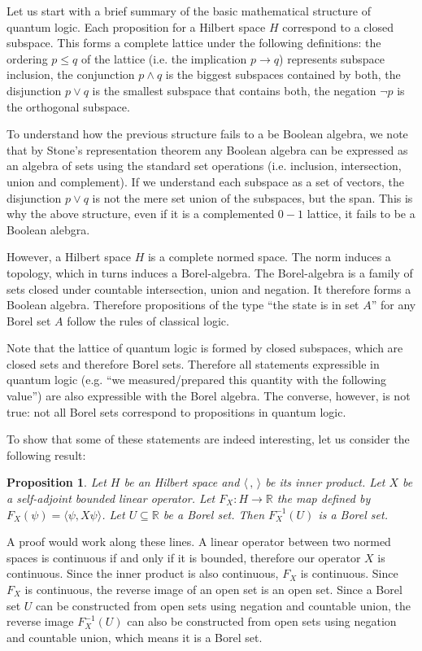 \documentclass[11pt, executivepaper]{article}
\newtheorem{prop}{Proposition}
\begin{document}
Let us start with a brief summary of the basic mathematical structure of quantum logic. Each proposition for a Hilbert space $H$ correspond to a closed subspace. This forms a complete lattice under the following definitions: the ordering $p \leq q$ of the lattice (i.e. the implication $p \to q$) represents subspace inclusion, the conjunction $p \wedge q$ is the biggest subspaces contained by both, the disjunction $p \vee q$ is the smallest subspace that contains both, the negation $\neg p$ is the orthogonal subspace.

To understand how the previous structure fails to a be Boolean algebra, we note that by Stone's representation theorem any Boolean algebra can be expressed as an algebra of sets using the standard set operations (i.e. inclusion, intersection, union and complement). If we understand each subspace as a set of vectors, the disjunction $p \vee q$ is not the mere set union of the subspaces, but the span. This is why the above structure, even if it is a complemented $0-1$ lattice, it fails to be a Boolean alebgra.

However, a Hilbert space $H$ is a complete normed space. The norm induces a topology, which in turns induces a Borel-algebra. The Borel-algebra is a family of sets closed under countable intersection, union and negation. It therefore forms a Boolean algebra. Therefore propositions of the type ``the state is in set $A$'' for any Borel set $A$ follow the rules of classical logic.

Note that the lattice of quantum logic is formed by closed subspaces, which are closed sets and therefore Borel sets. Therefore all statements expressible in quantum logic (e.g. ``we measured/prepared this quantity with the following value'') are also expressible with the Borel algebra. The converse, however, is not true: not all Borel sets correspond to propositions in quantum logic.

To show that some of these statements are indeed interesting, let us consider the following result:

\begin{prop}
	Let $H$ be an Hilbert space and $\langle \, , \, \rangle$ be its inner product. Let $X$ be a self-adjoint bounded linear operator. Let $F_X : H \to \mathbb{R}$ the map defined by $F_X(\psi) = \langle \psi , X \psi \rangle$. Let $U \subseteq \mathbb{R}$ be a Borel set. Then $F_X^{-1}(U)$ is a Borel set.
\end{prop}

A proof would work along these lines. A linear operator between two normed spaces is continuous if and only if it is bounded, therefore our operator $X$ is continuous. Since the inner product is also continuous, $F_X$ is continuous. Since $F_X$ is continuous, the reverse image of an open set is an open set. Since a Borel set $U$ can be constructed from open sets using negation and countable union, the reverse image $F_X^{-1}(U)$ can also be constructed from open sets using negation and countable union, which means it is a Borel set.
\end{document}
